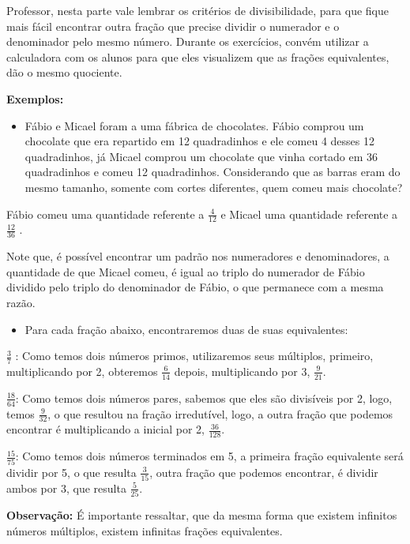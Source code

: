 Professor, nesta parte vale lembrar os critérios de divisibilidade, para
que fique mais fácil encontrar outra fração que precise dividir o
numerador e o denominador pelo mesmo número. Durante os exercícios,
convém utilizar a calculadora com os alunos para que eles visualizem que
as frações equivalentes, dão o mesmo quociente.

\textbf{Exemplos:}

\begin{itemize}
\tightlist
\item
  Fábio e Micael foram a uma fábrica de chocolates. Fábio comprou um
  chocolate que era repartido em 12 quadradinhos e ele comeu 4 desses 12
  quadradinhos, já Micael comprou um chocolate que vinha cortado em 36
  quadradinhos e comeu 12 quadradinhos. Considerando que as barras eram
  do mesmo tamanho, somente com cortes diferentes, quem comeu mais
  chocolate?
\end{itemize}

Fábio comeu uma quantidade referente a \(\frac{4}{12}\) e Micael uma
quantidade referente a \(\frac{12}{36}\) .

Note que, é possível encontrar um padrão nos numeradores e
denominadores, a quantidade de que Micael comeu, é igual ao triplo do
numerador de Fábio dividido pelo triplo do denominador de Fábio, o que
permanece com a mesma razão.

\begin{itemize}
\tightlist
\item
  Para cada fração abaixo, encontraremos duas de suas equivalentes:
\end{itemize}

\(\frac{3}{7}\) : Como temos dois números primos, utilizaremos seus
múltiplos, primeiro, multiplicando por 2, obteremos \(\frac{6}{14}\)
depois, multiplicando por 3, \(\frac{9}{21}\).

\(\frac{18}{64}\): Como temos dois números pares, sabemos que eles são
divisíveis por 2, logo, temos \(\frac{9}{32}\), o que resultou na fração
irredutível, logo, a outra fração que podemos encontrar é multiplicando
a inicial por 2, \(\frac{36}{128}\).

\(\frac{15}{75}\): Como temos dois números terminados em 5, a primeira
fração equivalente será dividir por 5, o que resulta \(\frac{3}{15}\),
outra fração que podemos encontrar, é dividir ambos por 3, que resulta
\(\frac{5}{25}\).

\textbf{Observação:} É importante ressaltar, que da mesma forma que
existem infinitos números múltiplos, existem infinitas frações
equivalentes.

